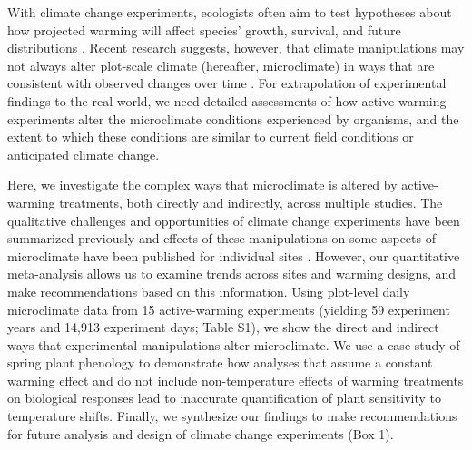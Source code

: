 \documentclass{article}
\begin{document}
\par With climate change experiments, ecologists often aim to test hypotheses about how projected warming will affect species' growth, survival, and future distributions \citep{dukes1999,hobbie1999,morin2010,pelini2011,chuine2012,reich2015,gruner2017}. %
Recent research suggests, however, that climate manipulations may not always alter plot-scale climate (hereafter, microclimate) in ways that are consistent with observed changes over time \citep{wolkovich2012,menke2014,polgar2014,andresen2016}. For extrapolation of experimental findings to the real world, we need detailed assessments of how active-warming experiments alter the microclimate conditions experienced by organisms, and the extent to which these conditions are similar to current field conditions or anticipated climate change. 
\par Here, we investigate the complex ways that microclimate is altered by active-warming treatments, both directly and indirectly, across multiple studies. The qualitative challenges and opportunities of climate change experiments have been summarized previously \citep[e.g.,][]{deboeck2015} and effects of these manipulations on some aspects of microclimate have been published for individual sites \citep[e.g.,][]{harte1995b,mcdaniel2014,pelini2011}. However, our quantitative meta-analysis allows us to examine trends across sites and warming designs, and make recommendations based on this information. Using plot-level daily microclimate data from 15 active-warming experiments (yielding 59 experiment years and 14,913 experiment days; Table S1), we show the direct and indirect ways that experimental manipulations alter microclimate. We use a case study of spring plant phenology to demonstrate how analyses that assume a constant warming effect and do not include non-temperature effects of warming treatments on biological responses lead to inaccurate quantification of plant sensitivity to temperature shifts. Finally, we synthesize our findings to make recommendations for future analysis and design of climate change experiments (Box 1). 
\end{document}

